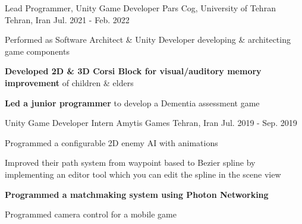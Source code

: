 

\begin{cventries}

  \cventry
    {Lead Programmer, Unity Game Developer} %
    {Pars Cog, University of Tehran} %
    {Tehran, Iran} %
    {Jul. 2021 - Feb. 2022} %
    {
      \begin{cvitems} %
        \item {Performed as Software Architect \& Unity Developer developing \& architecting game components}
        \item {\textbf{Developed 2D \& 3D Corsi Block for visual/auditory memory improvement} of children \& elders 
        \href{https://null3rror.itch.io/corsi-block}{\faExternalLink}}
        \item {\textbf{Led a junior programmer} to develop a Dementia assessment game}
      \end{cvitems}
    }

  \cventry
    {Unity Game Developer Intern} %
    {Amytis Games} %
    {Tehran, Iran} %
    {Jul. 2019 - Sep. 2019} %
    {
      \begin{cvitems} %
        \item {Programmed a configurable 2D enemy AI with animations}
        \item {Improved their path system from waypoint based to Bezier spline by implementing an editor tool which you can edit the spline in the scene view}
        \item {\textbf{Programmed a matchmaking system using Photon Networking}}
        \item {Programmed camera control for a mobile game}
      \end{cvitems}
    }

\end{cventries}
